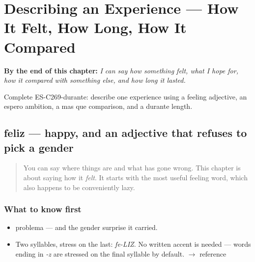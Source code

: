 
\chapter{Describing an Experience --- How It Felt, How Long, How It Compared}
\label{ch:experiencia}

\begin{chapteropening}
\textbf{By the end of this chapter:} \emph{I can say how something felt, what I hope for, how it compared with something else, and how long it lasted.}

Complete ES-C269-durante: describe one experience using a feeling adjective, an espero ambition, a mas que comparison, and a durante length.
\end{chapteropening}

\section[feliz]{feliz — happy, and an adjective that refuses to pick a gender}

\label{lesson:ES-C269-feliz}



\begin{quote}
You can say where things are and what has gone wrong. This chapter is about saying how it \emph{felt}. It starts with the most useful feeling word, which also happens to be conveniently lazy.
\end{quote}

\subsection*{What to know first}
\begin{itemize}
\raggedright
  \item problema — and the gender surprise it carried.
\end{itemize}

\begin{sounds}
\begin{itemize}
\raggedright
  \item Two syllables, stress on the last: \emph{fe-LIZ}. No written accent is needed — words ending in \emph{-z} are stressed on the final syllable by default. $\to$ reference
\end{itemize}
\end{sounds}

